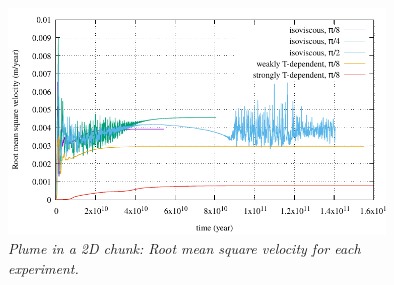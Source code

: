 \begin{figure}
  \centering
  \includegraphics[width=10cm]{cookbooks/plume_2D_chunk/doc/vrms}
  \caption{\it Plume in a 2D chunk: Root mean square velocity for each experiment.}
  \label{fig:plume-diff-creep-vrms}
\end{figure}

